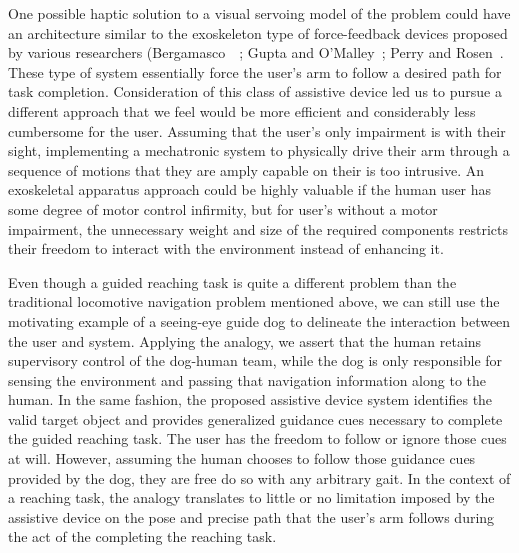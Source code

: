 One possible haptic solution to a visual servoing model of the problem could have an architecture similar to the exoskeleton type of force-feedback devices proposed by various researchers (Bergamasco~\etal~\cite{Bib:Bergamasco}; Gupta and O'Malley~\cite{GUPTA06}; Perry and Rosen~\cite{PERRY06}.  These type of system essentially force the user's arm to follow a desired path for task completion. Consideration of this class of assistive device led us to pursue a different approach that we feel would be more efficient and considerably less cumbersome for the user.  Assuming that the user's only impairment is with their sight, implementing a mechatronic system to physically drive their arm through a sequence of motions that they are amply capable on their is too intrusive. An exoskeletal apparatus approach could be highly valuable if the human user has some degree of motor control infirmity, but for user's without a motor impairment, the unnecessary weight and size of the required components restricts their freedom to interact with the environment instead of enhancing it.

Even though a guided reaching task is quite a different problem than the traditional locomotive navigation problem mentioned above, we can still use the motivating example of a seeing-eye guide dog to delineate the interaction between the user and system.  Applying the analogy, we assert that the human retains supervisory control of the dog-human team, while the dog is only responsible for sensing the environment and passing that navigation information along to the human.  In the same fashion, the proposed assistive device system identifies the valid target object and provides generalized guidance cues necessary to complete the guided reaching task.  The user has the freedom to follow or ignore those cues at will.  However, assuming the human chooses to follow those guidance cues provided by the dog, they are free do so with any arbitrary gait. In the context of a reaching task, the analogy translates to little or no limitation imposed by the assistive device on the pose and precise path that the user's arm follows during the act of the completing the reaching task.

